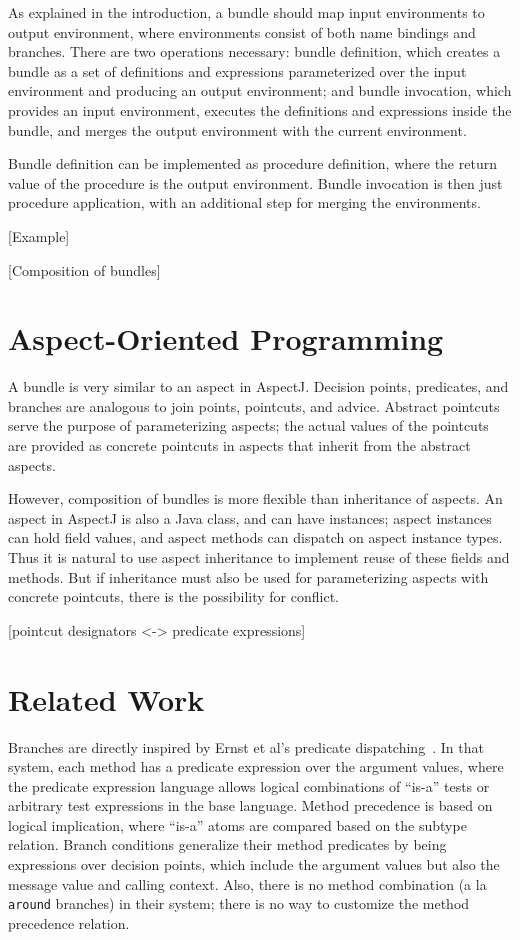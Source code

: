 \documentclass{article}
\newcommand{\code}[1]{\texttt{#1}}
\begin{document}
As explained in the introduction, a bundle should map input
environments to output environment, where environments consist of both
name bindings and branches.  There are two operations necessary:
bundle definition, which creates a bundle as a set of definitions and
expressions parameterized over the input environment and producing an
output environment; and bundle invocation, which provides an input
environment, executes the definitions and expressions inside the
bundle, and merges the output environment with the current
environment.

Bundle definition can be implemented as procedure definition, where
the return value of the procedure is the output environment.  Bundle
invocation is then just procedure application, with an additional step
for merging the environments.

[Example]

[Composition of bundles]

\section{Aspect-Oriented Programming}
\label{section:AOP}

A bundle is very similar to an aspect in AspectJ.  Decision points,
predicates, and branches are analogous to join points, pointcuts, and
advice.  Abstract pointcuts serve the purpose of parameterizing
aspects; the actual values of the pointcuts are provided as concrete
pointcuts in aspects that inherit from the abstract aspects.

However, composition of bundles is more flexible than inheritance of
aspects.  An aspect in AspectJ is also a Java class, and can have
instances; aspect instances can hold field values, and aspect methods
can dispatch on aspect instance types.  Thus it is natural to use
aspect inheritance to implement reuse of these fields and methods.
But if inheritance must also be used for parameterizing aspects with
concrete pointcuts, there is the possibility for conflict.  

[pointcut designators <-> predicate expressions]

\section{Related Work}
\label{section:related-work}

Branches are directly inspired by Ernst et al's predicate
dispatching~\cite{predicate-dispatch}.  In that system, each method has a
predicate expression over the argument values, where the predicate
expression language allows logical combinations of ``is-a'' tests or
arbitrary test expressions in the base language.  Method precedence is
based on logical implication, where ``is-a'' atoms are compared based
on the subtype relation.  Branch conditions generalize their method
predicates by being expressions over decision points, which include
the argument values but also the message value and calling context.
Also, there is no method combination (a la \code{around} branches) in
their system; there is no way to customize the method precedence
relation.
\end{document}
